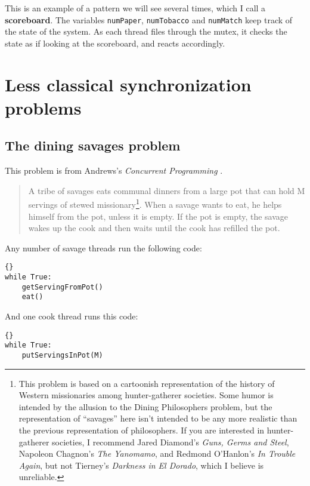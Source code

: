 \documentclass{book}
\newcommand{\clearemptydoublepage}{\newpage\cleardoublepage}
\begin{document}
This is an example of a pattern we will see several times, which
I call a {\bf scoreboard}.  The variables {\tt numPaper}, {\tt numTobacco}
and {\tt numMatch} keep track of the state of the system.  As each
thread files through the mutex, it checks the state as if looking
at the scoreboard, and reacts accordingly.


\clearemptydoublepage
\chapter{Less classical synchronization problems}
\label{next}


\section{The dining savages problem}

This problem is from Andrews's 
{\em Concurrent Programming} \cite{andrews}.

\begin {quotation}
A tribe of savages eats communal dinners from a large pot that can
hold M servings of stewed missionary\footnote{This problem is based on
a cartoonish representation of the history of Western missionaries
among hunter-gatherer societies.  Some humor is intended by the
allusion to the Dining Philosophers problem, but the representation of
``savages'' here isn't intended to be any more realistic than the
previous representation of philosophers.  If you are interested in
hunter-gatherer societies, I recommend Jared Diamond's {\em Guns,
Germs and Steel}, Napoleon Chagnon's {\em The Yanomamo}, and Redmond
O'Hanlon's {\em In Trouble Again}, but not Tierney's {\em Darkness in
El Dorado}, which I believe is unreliable.}.  When a savage wants to
eat, he helps himself from the pot, unless it is empty.  If the pot is
empty, the savage wakes up the cook and then waits until the cook has
refilled the pot.
\end{quotation}

Any number of savage threads run the following code:

\begin{lstlisting}[title={Unsynchronized savage code}]{}
while True:
    getServingFromPot()
    eat()
\end{lstlisting}

And one cook thread runs this code:

\begin{lstlisting}[title={Unsynchronized cook code}]{}
while True:
    putServingsInPot(M)
\end{lstlisting}
\end{document}
